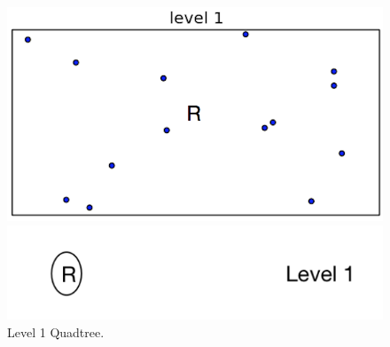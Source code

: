 \begin{figure}[H]
  \centering
  \vspace{0.5in}
  \begin{minipage}[b]{0.35\textwidth}
    \includegraphics[width=\textwidth]{Images/Quadtree_basic_scenario6}
  \end{minipage}
  \hfill
  \begin{minipage}[b]{0.4\textwidth}
    \includegraphics[width=\textwidth]{Images/R1}
  \end{minipage}
  \vspace{0.5in}
  \caption{Level 1 Quadtree.}
  \label{fig:level1quadtree}
\end{figure}


